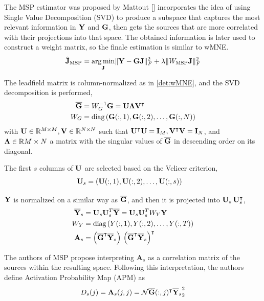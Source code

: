 The MSP estimator was proposed by Mattout []
incorporates the idea of using Single Value Decomposition (SVD) to produce a subspace that captures the most relevant information in $\mathbf{Y}$ and $\mathbf{G}$, then gets the sources that are more correlated with their projections into that space.
%
The obtained information is later used to construct a weight matrix, so the finale estimation is similar to wMNE.
\begin{equation}
\hat{\mathbf{J}}_\text{MSP} = \operatorname*{arg\,min}_{\mathbf{J}} \lVert \mathbf{Y} - \mathbf{G} \mathbf{J} \rVert_F^2 + \lambda\lVert W_\text{MSP} \mathbf{J} \rVert_F^2
\end{equation}

The leadfield matrix is column-normalized as in \ref{det:wMNE}, and the SVD decomposition is performed, 
\begin{align}
\overline{\mathbf{G}} &= W_G^{-1} \mathbf{G} = \mathbf{U} \mathbf{\Lambda} \mathbf{V}^\intercal
\\
W_G &= \text{diag}\left(   \mathbf{G}(:,1), \mathbf{G}(:,2), \dots, \mathbf{G}(:,N)   \right)
\end{align}
with $\mathbf{U}\in \mathbb{R}^{M\times M},\mathbf{V}\in \mathbb{R}^{N\times N}$ such that $\mathbf{U}^\intercal \mathbf{U} = \mathbf{I}_M, \mathbf{V}^\intercal\mathbf{V} = \mathbf{I}_N$, and $\mathbf{\Lambda} \in \mathbb{R}{M\times N}$ a matrix with the singular values of $\overline{\mathbf{G}}$ in descending order on its diagonal.

The first $s$ columns of $\mathbf{U}$ are selected based on the Velicer criterion,
\begin{align}
\mathbf{U}_s 
&= 
\left(  \mathbf{U}(:,1), \mathbf{U}(:,2), \dots, \mathbf{U}(:,s)  \right)
\end{align}

$\mathbf{Y}$ is normalized on a similar way as $\overline{\mathbf{G}}$, and then it is projected into $\mathbf{U}_s\, \mathbf{U}_s^\intercal$,
\begin{align}
\overline{\mathbf{Y}}_s 
&=
\mathbf{U}_s \mathbf{U}_s^T \overline{\mathbf{Y}} = \mathbf{U}_s \mathbf{U}_s^T W_Y \mathbf{Y}
\\
W_Y &= \text{diag}\left(   Y(:,1), Y(:,2), \dots, Y(:,T)   \right)
\\
\mathbf{A}_s &= \left( \overline{\mathbf{G}}^\intercal \overline{\mathbf{Y}}_s \right)\, \left( \overline{\mathbf{G}}^\intercal \overline{\mathbf{Y}}_s \right)^\intercal
\end{align}

The authors of MSP propose interpreting $\mathbf{A}_s$ as a correlation matrix of the sources within the resulting space.
%
Following this interpretation, the authors define {Activation Probability Map} (APM) as
\begin{align}
{D}_s(j) = \mathbf{A}_s(j,j) = \mathcal{N}{\overline{\mathbf{G}}(:,j)^\intercal \overline{\mathbf{Y}}_s  }_2^2
\end{align}


